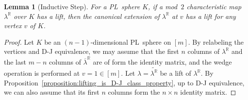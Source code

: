 \documentclass[11pt]{amsart}
\theoremstyle{plain}
\newtheorem{lemma}[theorem]{Lemma}
\numberwithin{equation}{section}
\theoremstyle{definition}
\newcommand{\R}{\mathbb{R}}
\begin{document}
\begin{lemma}[Inductive Step] \label{lemma:inductive step}
    For a PL~sphere $K$, if a mod~$2$ characteristic map $\lambda^\R$ over $K$ has a lift, then the canonical extension of $\lambda^\R$ at $v$ has a lift for any vertex $v$ of $K$.
\end{lemma}

\begin{proof}
    Let $K$ be an $(n-1)$-dimensional PL~sphere on $[m]$.
    By relabeling the vertices and D-J equivalence, we may assume that the first $n$ columns of $\lambda^\R$ and the last $m-n$ columns of $\overline{\lambda}^\R$ are of form the identity matrix, and the wedge operation is performed at $v=1 \in [m]$.
    Let $\lambda=\widetilde{\lambda^\R}$ be a lift of $\lambda^\R$.
    By Proposition~\ref{proposition:lifting_is_D-J_class_property}, up to D-J equivalence, we can also assume that its first $n$ columns form the $n \times n$ identity matrix.


\end{proof}
\end{document}
